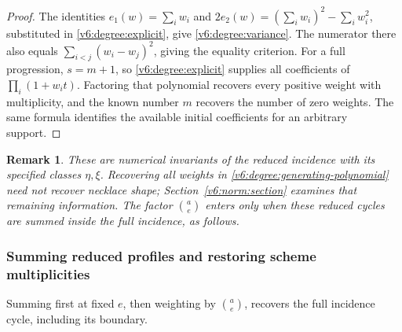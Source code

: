 \documentclass[10pt,fleqn]{article}
\numberwithin{equation}{section}
\newtheorem{remark}[theorem]{Remark}
\begin{document}
\begin{proof}
The identities
$e_1(w)=\sum_iw_i$ and
$2e_2(w)=(\sum_iw_i)^2-\sum_iw_i^2$, substituted in
\eqref{v6:degree:explicit}, give \eqref{v6:degree:variance}.
The numerator there also equals
$\sum_{i<j}(w_i-w_j)^2$, giving the equality criterion.
For a full progression, $s=m+1$, so
\eqref{v6:degree:explicit} supplies all coefficients of
$\prod_i(1+w_it)$.  Factoring that polynomial recovers every
positive weight with multiplicity, and the known number $m$
recovers the number of zero weights.  The same formula identifies
the available initial coefficients for an arbitrary support.
\end{proof}

\begin{remark}\label{v6:degree:scope}
These are numerical invariants of the reduced incidence with its specified
classes $\eta,\xi$.  Recovering all weights in
\eqref{v6:degree:generating-polynomial} need not recover necklace shape;
Section~\ref{v6:norm:section} examines that remaining information.
The factor $\binom ae$ enters only when these reduced cycles are summed
inside the full incidence, as follows.
\end{remark}

\subsubsection{Summing reduced profiles and restoring scheme multiplicities}
\label{r19:sec:cycle-conservation}
Summing first at fixed $e$, then weighting by $\binom ae$, recovers
the full incidence cycle, including its boundary.
\end{document}
